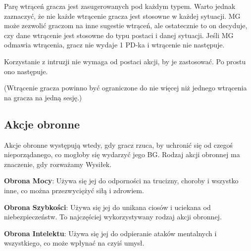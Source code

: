 Parę wtrąceń gracza jest zasugerowanych pod każdym typem. Warto jednak zaznaczyć, że nie każde wtrącenie gracza jest stosowne w każdej sytuacji. MG może zezwolić graczom na inne sugestie wtrąceń, ale ostatecznie to on decyduje, czy dane wtrącenie jest stosowne do typu postaci i danej sytuacji. Jeśli MG odmawia wtrącenia, gracz nie wydaje 1 PD-ka i wtrącenie nie następuje.

Korzystanie z intruzji nie wymaga od postaci akcji, by je zastosować. Po prostu ono następuje.

(Wtrącenie gracza powinno być ograniczone do nie więcej niż jednego wtrącenia na gracza na jedną sesję.)

\subsection{Akcje obronne}

Akcje obronne występują wtedy, gdy gracz rzuca, by uchronić się od czegoś nieporządanego, co mogłoby się wydarzyć jego BG. Rodzaj akcji obronnej ma znaczenie, gdy rozważamy Wysiłek.

\textbf{Obrona Mocy}: Używa się jej do odporności na trucizny, choroby i wszystko inne, co można przezwyciężyć siłą i zdrowiem.

\textbf{Obrona Szybkości}: Używa się jej do unikana ciosów i uciekana od niebezpieczeństw. To najczęściej wykorzystywany rodzaj akcji obronnej.

\textbf{Obrona Intelektu}: Używa się jej do odpieranie ataków mentalnych i wszystkiego, co może wpłynać na czyiś umysł.